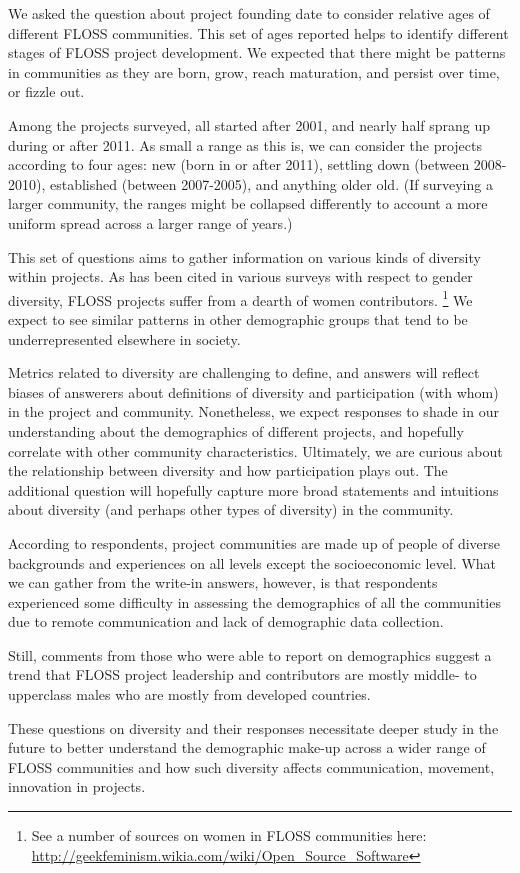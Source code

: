We asked the question about project founding date to consider relative ages of different FLOSS communities. This set of ages reported helps to identify different stages of FLOSS project development. We expected that there might be patterns in communities as they are born, grow, reach maturation, and persist over time, or fizzle out. 

Among the projects surveyed, all started after 2001, and nearly half sprang up during or after 2011. As small a range as this is, we can consider the projects according to four ages: new (born in or after 2011), settling down (between 2008-2010), established (between 2007-2005), and anything older old. (If surveying a larger community, the ranges might be collapsed differently to account a more uniform spread across a larger range of years.)

This set of questions aims to gather information on various kinds of diversity within projects. As has been cited in various surveys with respect to gender diversity, FLOSS projects suffer from a dearth of women contributors. \footnote{See a number of sources on women in FLOSS communities here: \url{http://geekfeminism.wikia.com/wiki/Open_Source_Software}} We expect to see similar patterns in other demographic groups that tend to be underrepresented elsewhere in society.

Metrics related to diversity are challenging to define, and answers will reflect biases of answerers about definitions of diversity and participation (with whom) in the project and community. Nonetheless, we expect responses to shade in our understanding about the demographics of different projects, and hopefully correlate with other community characteristics. Ultimately, we are curious about the relationship between diversity and how participation plays out. The additional question will hopefully capture more broad statements and intuitions about diversity (and perhaps other types of diversity) in the community.

According to respondents, project communities are made up of people of diverse backgrounds and experiences on all levels except the socioeconomic level. What we can gather from the write-in answers, however, is that respondents experienced some difficulty in assessing the demographics of all the communities due to remote communication and lack of demographic data collection. 

Still, comments from those who were able to report on demographics suggest a trend that FLOSS project leadership and contributors are mostly middle- to upperclass males who are mostly from developed countries. 

These questions on diversity and their responses necessitate deeper study in the future to better understand the demographic make-up across a wider range of FLOSS communities and how such diversity affects communication, movement, innovation in projects. 


